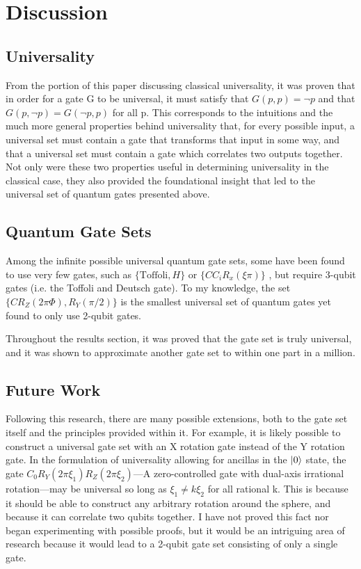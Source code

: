 \documentclass[12pt]{article}
\begin{document}
\section{Discussion}
\subsection{Universality}
From the portion of this paper discussing classical universality, it was proven that in order for a gate G to be universal, it must satisfy that $G(p, p) = \neg p$ and that $G(p, \neg p) = G(\neg p, p)$ for all p. This corresponds to the intuitions and the much more general properties behind universality that, for every possible input, a universal set must contain a gate that transforms that input in some way, and that a universal set must contain a gate which correlates two outputs together. Not only were these two properties useful in determining universality in the classical case, they also provided the foundational insight that led to the universal set of quantum gates presented above.

\subsection{Quantum Gate Sets}
Among the infinite possible universal quantum gate sets, some have been found to use very few gates, such as $\{\text{Toffoli}, H\}$ \cite{Shi2002} or $\{CC_iR_x(\xi\pi)\}$ \cite{Deutsch1995}, but require 3-qubit gates (i.e. the Toffoli and Deutsch gate). To my knowledge, the set $\{CR_Z(2\pi\Phi), R_Y(\pi/2)\}$ is the smallest universal set of quantum gates yet found to only use 2-qubit gates.

Throughout the results section, it was proved that the gate set is truly universal, and it was shown to approximate another gate set to within one part in a million.

\subsection{Future Work}
Following this research, there are many possible extensions, both to the gate set itself and the principles provided within it. For example, it is likely possible to construct a universal gate set with an X rotation gate instead of the Y rotation gate. In the formulation of universality allowing for ancillas in the $\ket{0}$ state, the gate $C_0R_Y(2\pi\xi_1)R_Z(2\pi\xi_2)$---A zero-controlled gate with dual-axis irrational rotation---may be universal so long as $\xi_1 \ne k \xi_2$ for all rational k. This is because it should be able to construct any arbitrary rotation around the sphere, and because it can correlate two qubits together. I have not proved this fact nor began experimenting with possible proofs, but it would be an intriguing area of research because it would lead to a 2-qubit gate set consisting of only a single gate.

\pagebreak
\nocite{Barenco1995, Nielsen2023}
\printbibliography
\end{document}

